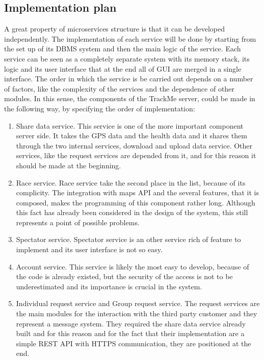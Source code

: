 \subsection{Implementation plan}
A great property of microservices structure is that it can be developed independently. The implementation of each service will be done by starting from the set up of its DBMS system and then the main logic of the service. Each service can be seen as a completely separate system with its memory stack, its logic and its user interface that at the end all of GUI are merged in a single interface. The order in which the service is be carried out depends on a number of factors, like the complexity of the services and the dependence of other modules. In this sense, the components of the TrackMe server, could be made in the following way, by specifying the order of implementation:
\begin{enumerate}
\item Share data service.
This service is one of the more important component server side. It takes the GPS data and the health data and it shares them through the two internal services, download and upload data service. Other services, like the request services are depended from it, and for this reason it should be made at the beginning.
\item Race service.
Race service take the second place in the list, because of its complicity. The integration with maps API and the several features, that it is composed, makes the programming of this component rather long. Although this fact has already been considered in the design of the system, this still represents a point of possible problems.
\item Spectator service.
Spectator service is an other service rich of feature to implement and its user interface is not so easy.  
\item Account service.
This service is likely the most easy to develop, because of the code is already existed, but the security of the access is not to be underestimated and its importance is crucial in the system. 
\item Individual request service and Group request service.
The request services are the main modules for the interaction with the third party customer and they represent a message system. They required the share data service already built and for this reason and for the fact that their implementation are a simple REST API with HTTPS communication, they are positioned at the end.
\end{enumerate}   
